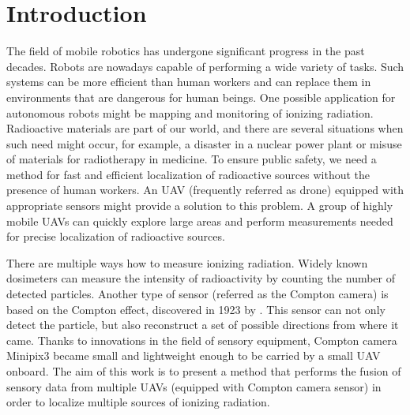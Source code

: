 \chapter{Introduction\label{chap:introduction}}
The field of mobile robotics has undergone significant progress in the past decades.
Robots are nowadays capable of performing a wide variety of tasks. 
Such systems can be more efficient than human workers and can replace them in environments that are dangerous for human beings.
One possible application for autonomous robots might be mapping and monitoring of ionizing radiation. 
Radioactive materials are part of our world, and there are several situations when such need might occur, for example, a disaster in a nuclear power plant or misuse of materials for radiotherapy in medicine. 
To ensure public safety, we need a method for fast and efficient localization of radioactive sources without the presence of human workers.
An \ac{UAV} (frequently referred as drone) equipped with appropriate sensors might provide a solution to this problem.
A group of highly mobile \ac{UAV}s can quickly explore large areas and perform measurements needed for precise localization of radioactive sources.


There are multiple ways how to measure ionizing radiation.
Widely known dosimeters can measure the intensity of radioactivity by counting the number of detected particles.
Another type of sensor (referred as the Compton camera) is based on the Compton effect, discovered in 1923 by \cite{compton}.
This sensor can not only detect the particle, but also reconstruct a set of possible directions from where it came.
Thanks to innovations in the field of sensory equipment, Compton camera Minipix3 became small and lightweight enough to be carried by a small \ac{UAV} onboard.
The aim of this work is to present a method that performs the fusion of sensory data from multiple \ac{UAV}s (equipped with Compton camera sensor) in order to localize multiple sources of ionizing radiation.



